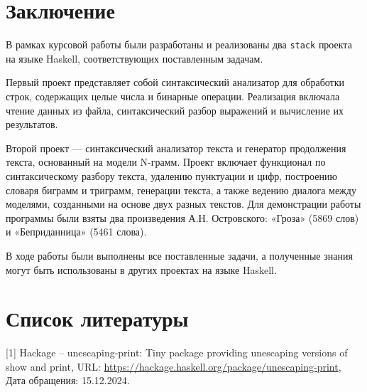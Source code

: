 \documentclass[a4paper, final]{article}
\begin{document}
\newpage
\section*{Заключение}
В рамках курсовой работы были разработаны и реализованы два \texttt{stack} проекта на языке Haskell, соответствующих поставленным задачам. 

Первый проект представляет собой синтаксический анализатор для обработки строк, содержащих целые числа и бинарные операции. Реализация включала чтение данных из файла, синтаксический разбор выражений и вычисление их результатов.

Второй проект — синтаксический анализатор текста и генератор продолжения текста, основанный на модели N-грамм. Проект включает функционал по синтаксическому разбору текста, удалению пунктуации и цифр, построению словаря биграмм и триграмм, генерации текста, а также ведению диалога между моделями, созданными на основе двух разных текстов. Для демонстрации работы программы были взяты два произведения А.Н. Островского: «Гроза» (5869 слов) и «Беприданница» (5461 слова).

В ходе работы были выполнены все поставленные задачи, а полученные знания могут быть использованы в других проектах на языке Haskell.


\newpage
\section*{Список литературы}

[1] Hackage -- unescaping-print: Tiny package providing unescaping versions of show and print, URL: \url{https://hackage.haskell.org/package/unescaping-print}, Дата обращения: 15.12.2024.
\end{document}
